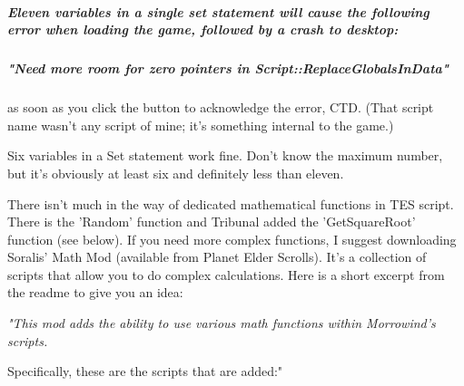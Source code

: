 \documentclass[
]{article}
\begin{document}
\hypertarget{eleven-variables-in-a-single-set-statement-will-cause-the-following-error-when-loading-the-game-followed-by-a-crash-to-desktop}{%
\subparagraph{\texorpdfstring{\emph{Eleven variables in a single set
statement will cause the following error when loading the game, followed
by a crash to
desktop:}}{Eleven variables in a single set statement will cause the following error when loading the game, followed by a crash to desktop:}}\label{eleven-variables-in-a-single-set-statement-will-cause-the-following-error-when-loading-the-game-followed-by-a-crash-to-desktop}}

\hypertarget{need-more-room-for-zero-pointers-in-scriptreplaceglobalsindata}{%
\subparagraph{"Need more room for zero pointers in
Script::ReplaceGlobalsInData"}\label{need-more-room-for-zero-pointers-in-scriptreplaceglobalsindata}}

as soon as you click the button to acknowledge the error, CTD. (That
script name wasn't any script of mine; it's something internal to the
game.)

Six variables in a Set statement work fine. Don't know the maximum
number, but it's obviously at least six and definitely less than eleven.

There isn't much in the way of dedicated mathematical functions in TES
script. There is the 'Random' function and Tribunal added the
'GetSquareRoot' function (see below). If you need more complex
functions, I suggest downloading Soralis' Math Mod (available from
Planet Elder Scrolls). It's a collection of scripts that allow you to do
complex calculations. Here is a short excerpt from the readme to give
you an idea:

\emph{"This mod adds the ability to use various math functions within
Morrowind's scripts.}

Specifically, these are the scripts that are added:"
\end{document}
